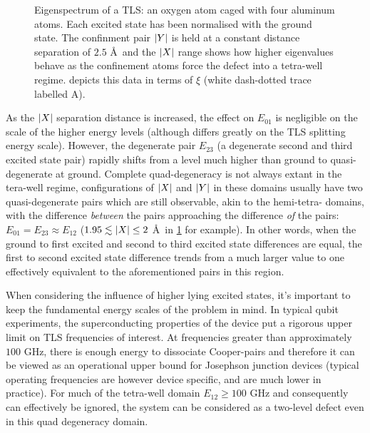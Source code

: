 \begin{figure}[htp]
  \resizebox{0.9\textwidth}{!}{}
  \caption[Eigenspectrum of a  TLS]{\label{fig:tetraspectrum}Eigenspectrum of a  TLS: an oxygen atom caged with four aluminum atoms. Each excited state has been normalised with the ground state. The confinment pair $\lvert Y\rvert$ is held at a constant distance separation of $2.5$ \AA\ and the $\lvert X\rvert$ range shows how higher eigenvalues behave as the confinement atoms force the defect into a tetra-well regime.  depicts this data in terms of $\xi$ (white dash-dotted trace labelled A). }
\end{figure}

As the $\lvert X\rvert$ separation distance is increased, the effect on $E_{01}$ is negligible on the scale of the higher energy levels (although differs greatly on the TLS splitting energy scale).
However, the degenerate pair $E_{23}$ (a degenerate second and third excited state pair) rapidly shifts from a level much higher than ground to quasi-degenerate at ground.
Complete quad-degeneracy is not always extant in the tera-well regime, configurations of $\lvert X\rvert$ and $\lvert Y\rvert$ in these domains usually have two quasi-degenerate pairs which are still observable, akin to the hemi-tetra- domains, with the difference \textit{between} the pairs approaching the difference \textit{of} the pairs: $E_{01} = E_{23} \approx E_{12}$ ($1.95 \lesssim \lvert X\rvert \leq 2$ \AA\ in \cref{fig:tetraspectrum} for example).
In other words, when the ground to first excited and second to third excited state differences are equal, the first to second excited state difference trends from a much larger value to one effectively equivalent to the aforementioned pairs in this region.

When considering the influence of higher lying excited states, it's important to keep the fundamental energy scales of the problem in mind.
In typical qubit experiments, the superconducting properties of the device put a rigorous upper limit on TLS frequencies of interest.
At frequencies greater than approximately $100$ GHz, there is enough energy to dissociate Cooper-pairs and therefore it can be viewed as an operational upper bound for Josephson junction devices (typical operating frequencies are however device specific, and are much lower in practice).
For much of the tetra-well domain $E_{12} \geq 100$ GHz and consequently can effectively be ignored, the system can be considered as a two-level defect even in this quad degeneracy domain.

